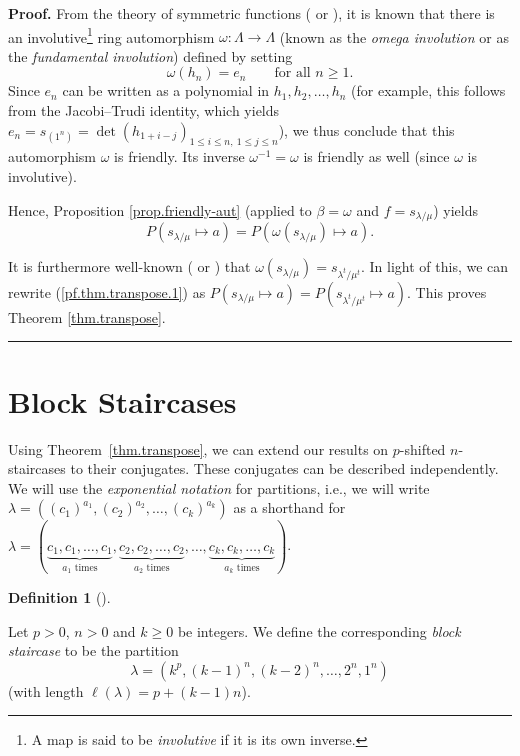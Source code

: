 \documentclass[numbers=enddot,12pt,final,onecolumn,notitlepage]{scrartcl}%
\theoremstyle{definition}
\newtheorem{defi}[theo]{Definition}
\newenvironment{definition}[1][]
{\begin{defi}[#1]\begin{leftbar}}
{\end{leftbar}\end{defi}}
\newenvironment{proof}[1][Proof]{\noindent\textbf{#1.} }{\ \rule{0.5em}{0.5em}}
\newenvironment{verlong}{}{}
\renewcommand{\leq}{\leqslant}
\renewcommand{\geq}{\geqslant}
\theoremstyle{plainsl}
\begin{document}
\begin{verlong}
\begin{proof}
From the theory of symmetric functions (\cite[\S 7.6]{EC2} or \cite[(2.7)]%
{Macdonald}), it is known that there is an involutive\footnote{A map is said
to be \emph{involutive} if it is its own inverse.} ring automorphism
$\omega:\Lambda\rightarrow\Lambda$ (known as the \emph{omega involution} or as
the \emph{fundamental involution}) defined by setting
\[
\omega\left(  h_{n}\right)  =e_{n}\qquad\text{for all }n\geq1.
\]
Since $e_{n}$ can be written as a polynomial in $h_{1},h_{2},\ldots,h_{n}$
(for example, this follows from the Jacobi--Trudi identity, which yields
$e_{n}=s_{\left(  1^{n}\right)  }=\det\left(  h_{1+i-j}\right)  _{1\leq i\leq
n,\ 1\leq j\leq n}$), we thus conclude that this automorphism $\omega$ is
friendly. Its inverse $\omega^{-1}=\omega$ is friendly as well (since $\omega$
is involutive).

Hence, Proposition \ref{prop.friendly-aut} (applied to $\beta=\omega$ and
$f=s_{\lambda/\mu}$) yields%
\begin{equation}
P\left(  s_{\lambda/\mu}\mapsto a\right)  =P\left(  \omega\left(
s_{\lambda/\mu}\right)  \mapsto a\right)  .\label{pf.thm.transpose.1}%
\end{equation}


It is furthermore well-known (\cite[Theorem 7.15.6]{EC2} or \cite[(5.6)]%
{Macdonald}) that $\omega\left(  s_{\lambda/\mu}\right)  =s_{\lambda^{t}%
/\mu^{t}}$. In light of this, we can rewrite (\ref{pf.thm.transpose.1}) as
$P\left(  s_{\lambda/\mu}\mapsto a\right)  =P\left(  s_{\lambda^{t}/\mu^{t}%
}\mapsto a\right)  $. This proves Theorem \ref{thm.transpose}.
\end{proof}
\end{verlong}


\section{Block Staircases}

Using Theorem~\ref{thm.transpose}, we can extend our results on
$p$-shifted $n$-staircases to their conjugates. These conjugates can
be described independently.
We will use the \emph{exponential notation} for partitions, i.e.,
we will write $\lambda =((c_1)^{a_1}, (c_2)^{a_2}, \ldots, (c_k)^{a_k})$
as a shorthand for $\lambda = ( \underbrace{c_1,c_1,\ldots,c_1}_{a_1
\text{ times}},  \underbrace{c_2,c_2,\ldots,c_2}_{a_2
\text{ times}}, \ldots, \underbrace{c_k,c_k,\ldots,c_k}_{a_k
\text{ times}})$.

\begin{definition}
Let $p > 0$, $n > 0$ and $k \geq 0$ be integers.
We define the corresponding \emph{block staircase} to be the partition
\[
\lambda = ( k^p, (k-1)^n, (k-2)^n, \ldots,  2^n, 1^n
)
\]
(with length $\ell(\lambda) = p+(k-1)n$).
\end{definition}
\end{document}
